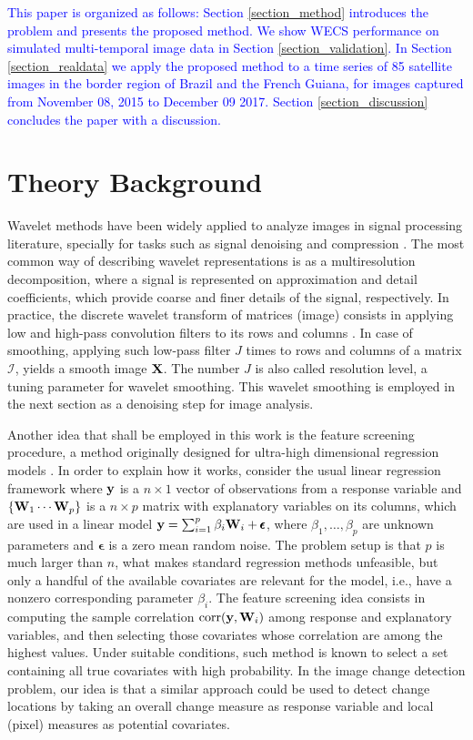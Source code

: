\documentclass[journal]{IEEEtran}
\newcommand{\vepsilon}{\pmb{\epsilon}}
\newcommand{\vW}{{\textbf W}}
\newcommand{\vX}{{\textbf X}}
\newcommand{\vy}{{\textbf y}}
\begin{document}
\textcolor{blue}{This paper is organized as follows:
Section \ref{section_method} introduces the problem and presents the proposed method. We show WECS performance on simulated multi-temporal image data in Section \ref{section_validation}. In Section \ref{section_realdata} we apply the proposed method to a time series of 85 satellite images in the border region of Brazil and the French Guiana, for  images captured from November 08, 2015 to December 09 2017.  Section \ref{section_discussion} concludes the paper with a discussion.}

\section{Theory Background}\label{section_theroy}

Wavelet methods have been widely applied to analyze images in signal processing literature, specially for tasks such as signal denoising and compression \cite{mallat1998wavelet}. The most common way of describing wavelet representations is as a multiresolution decomposition, where a signal is represented on approximation and detail coefficients, which provide coarse and finer details of the signal, respectively. In practice, the discrete wavelet transform of matrices (image) consists in applying low and high-pass convolution filters to its rows and columns \cite{mallat1989theory}. In case of smoothing, applying such low-pass filter $J$ times to rows and columns of a matrix $\mathcal{I}$, yields a smooth image $\vX$. The number $J$ is also called resolution level, a tuning parameter for wavelet smoothing. This wavelet smoothing is employed in the next section as a denoising step for image analysis.

Another idea that shall be employed in this work is the feature screening procedure, a method originally designed for ultra-high dimensional regression models \cite{fan2008sure}. In order to explain how it works, consider the usual linear regression framework where $\vy$ is a $n\times 1$ vector of observations from a response variable and $\{\vW_1 \cdots \vW_p\}$ is a $n\times p$ matrix with explanatory variables on its columns, which are used in a linear model $\vy = \sum_{i=1}^{p}\beta_i\vW_i + \vepsilon$, where $\beta_1,\ldots,\beta_p$ are unknown parameters and $\vepsilon$ is a zero mean random noise. The problem setup is that $p$ is much larger than $n$, what makes standard regression methods unfeasible, but only a handful of the available covariates are relevant for the model, i.e., have a nonzero corresponding parameter $\beta_i$. The feature screening idea consists in computing the sample correlation $\mathrm{corr}(\vy,\vW_i)$ among response and explanatory variables, and then selecting those covariates whose correlation are among the highest values. Under suitable conditions, such method is known to select a set containing all true covariates with high probability. In the image change detection problem, our idea is that a similar approach could be used to detect change locations by taking an overall change measure as response variable and local (pixel) measures as potential covariates.
\end{document}
